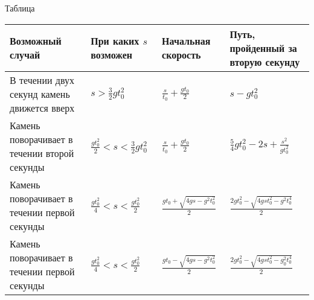 \begin{flushright}
	Таблица
\end{flushright}\vspace{-0.3cm}
\begin{tabular}{|m{3.7cm}|>{\centering\arraybackslash}p{4.2cm}|>{\centering\arraybackslash}p{4.2cm}|>{\centering\arraybackslash}p{4.2cm}|}
	\hline
	Возможный случай & При каких \(s\) возможен & Начальная скорость & Путь, пройденный за вторую секунду \\
	\hline
	В течении двух секунд камень движется вверх &\(s>\frac{3}{2}gt^2_0\) &\(\frac{s}{t_0}+\frac{gt_0}{2}\)&\(s-gt^2_0\)\\
	\hline
	Камень поворачивает в течении второй секунды & \(\frac{gt^2_0}{2}<s<\frac{3}{2}gt^2_0\)&\(\frac{s}{t_0}+\frac{gt_0}{2}\)&\(\frac{5}{4}gt^2_0-2s+\frac{s^2}{gt^2_0}\)\\
	\hline
	Камень поворачивает в течении первой секунды&\(\frac{gt^2_0}{4}<s<\frac{gt^2_0}{2}\)&\(\frac{gt_0+\sqrt{4gs-g^2t^2_0}}{2}\)&\(\frac{2gt^2_0-\sqrt{4gst^2_0-g^2t^4_0}}{2}\)\\
	\hline
	Камень поворачивает в течении первой секунды&\(\frac{gt^2_0}{4}<s<\frac{gt^2_0}{2}\)&\(\frac{gt_0-\sqrt{4gs-g^2t^2_0}}{2}\)&\(\frac{2gt^2_0-\sqrt{4gst^2_0-g^2_0t^4_0}}{2}\)\\
	\hline
\end{tabular}
